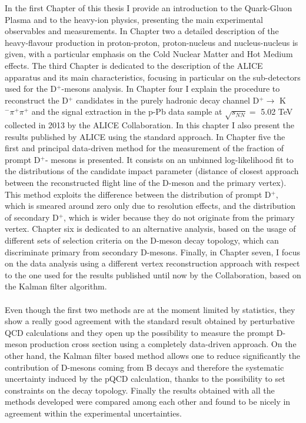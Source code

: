 \documentclass[b5paper,10pt,twoside,oldstyle,classica]{toptesi}
\begin{document}
In the first Chapter of this thesis I provide an introduction to the Quark-Gluon Plasma and to the heavy-ion physics, presenting the main experimental observables and measurements. In Chapter two a detailed description of the heavy-flavour production in proton-proton, proton-nucleus and nucleus-nucleus is given, with a particular emphasis on the Cold Nuclear Matter and Hot Medium effects. The third Chapter is dedicated to the description of the ALICE apparatus and its main characteristics, focusing in particular on the sub-detectors used for the D$^+$-mesons analysis. In Chapter four I explain the procedure to reconstruct the D$^+$ candidates in the purely hadronic decay channel D$^+ \rightarrow$ K$^-\pi^+\pi^+$ and the signal extraction in the p-Pb data sample at $\sqrt{s_{NN}} =$ 5.02 TeV collected in 2013 by the ALICE Collaboration. In this chapter I also present the results published by ALICE using the standard approach. In Chapter five the first and principal data-driven method for the measurement of the fraction of prompt D$^+$- mesons is presented. It consists on an unbinned log-likelihood fit to the distributions of the candidate impact parameter (distance of closest approach between the reconstructed flight line of the D-meson and the primary vertex). This method exploits the difference between the distribution of prompt D$^+$, which is smeared around zero only due to resolution effects, and the distribution of secondary D$^+$, which is wider because they do not originate from the primary vertex. Chapter six is dedicated to an alternative analysis, based on the usage of different sets of selection criteria on the D-meson decay topology, which can discriminate primary from secondary D-mesons. Finally, in Chapter seven, I focus on the data analysis using a different vertex reconstruction approach with respect to the one used for the results published until now by the Collaboration, based on the Kalman filter algorithm.\\\\
Even though the first two methods are at the moment limited by statistics, they show a really good agreement with the standard result obtained by perturbative QCD calculations and they open up the possibility to measure the prompt D-meson production cross section using a completely data-driven approach. On the other hand, the Kalman filter based method allows one to reduce significantly the contribution of D-mesons coming from B decays and therefore the systematic uncertainty induced by the pQCD calculation, thanks to the possibility to set constraints on the decay topology. Finally the results obtained with all the methods developed were compared among each other and found to be nicely in agreement within the experimental uncertainties.
\end{document}
